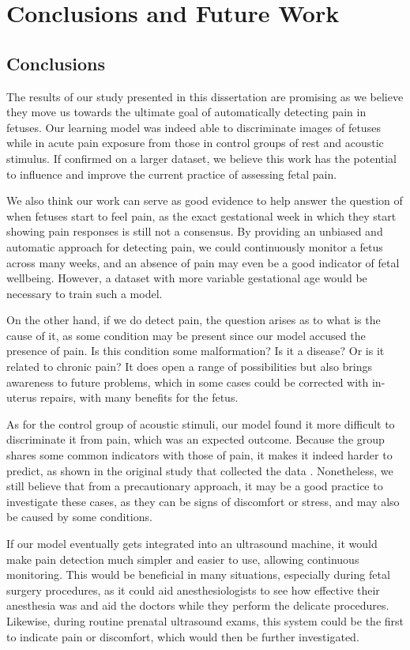 \chapter{Conclusions and Future Work}

\section{Conclusions}

The results of our study presented in this dissertation are promising as we believe they move us towards the ultimate goal of automatically detecting pain in fetuses. Our learning model was indeed able to discriminate images of fetuses while in acute pain exposure from those in control groups of rest and acoustic stimulus. If confirmed on a larger dataset, we believe this work has the potential to influence and improve the current practice of assessing fetal pain.

We also think our work can serve as good evidence to help answer the question of when fetuses start to feel pain, as the exact gestational week in which they start showing pain responses is still not a consensus. By providing an unbiased and automatic approach for detecting pain, we could continuously monitor a fetus across many weeks, and an absence of pain may even be a good indicator of fetal wellbeing. However, a dataset with more variable gestational age would be necessary to train such a model.

On the other hand, if we do detect pain, the question arises as to what is the cause of it, as some condition may be present since our model accused the presence of pain. Is this condition some malformation? Is it a disease? Or is it related to chronic pain? It does open a range of possibilities but also brings awareness to future problems, which in some cases could be corrected with in-uterus repairs, with many benefits for the fetus.

As for the control group of acoustic stimuli, our model found it more difficult to discriminate it from pain, which was an expected outcome.  Because the group shares some common indicators with those of pain, it makes it indeed harder to predict, as shown in the original study that collected the data \citep{bernardes2018feasibility}. Nonetheless, we still believe that from a precautionary approach, it may be a good practice to investigate these cases, as they can be signs of discomfort or stress, and may also be caused by some conditions.

If our model eventually gets integrated into an ultrasound machine, it would make pain detection much simpler and easier to use, allowing continuous monitoring. This would be beneficial in many situations, especially during fetal surgery procedures, as it could aid anesthesiologists to see how effective their anesthesia was and aid the doctors while they perform the delicate procedures. Likewise, during routine prenatal ultrasound exams, this system could be the first to indicate pain or discomfort, which would then be further investigated.

